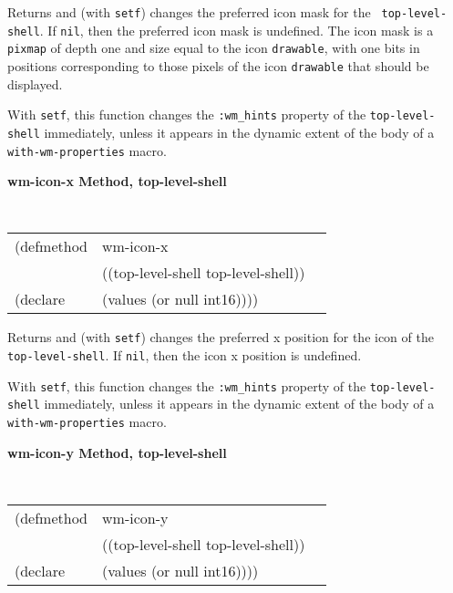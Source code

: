 \documentclass[twoside]{book}
\begin{document}
\begin{sloppy}
{\begin{flushright}
{}\end{flushright}}

\begin{flushright} \parbox[t]{6.125in}{
Returns and (with {\tt setf}) changes the preferred icon mask for the
{\tt
top-level-shell}. If {\tt nil}, then the preferred icon mask is
undefined. The icon mask is a {\tt pixmap} of depth one and size equal
to the icon {\tt drawable}, with one bits in positions corresponding to
those pixels of the icon {\tt drawable} that should be displayed.

With {\tt setf}, this function changes the {\tt :wm\_hints} property of
the {\tt top-level-shell} immediately, unless it appears in the dynamic extent of the
body of a {\tt with-wm-properties} macro.


}\end{flushright}

{\samepage
{\large {\bf wm-icon-x \hfill Method, top-level-shell}}
\begin{flushright} \parbox[t]{6.125in}{
\tt
\begin{tabular}{lll}
\raggedright
(defmethod & wm-icon-x & \\
           & ((top-level-shell  top-level-shell)) \\
(declare   & (values (or null int16))))
\end{tabular}
\rm

}\end{flushright}}

\begin{flushright} \parbox[t]{6.125in}{
Returns and (with {\tt setf}) changes the preferred x position for the icon of the {\tt
top-level-shell}. If {\tt nil}, then the icon x position is
undefined.

With {\tt setf}, this function changes the {\tt :wm\_hints} property of
the {\tt top-level-shell} immediately, unless it appears in the dynamic extent of the
body of a {\tt with-wm-properties} macro.


}\end{flushright}

{\samepage
{\large {\bf wm-icon-y \hfill Method, top-level-shell}}
\begin{flushright} \parbox[t]{6.125in}{
\tt
\begin{tabular}{lll}
\raggedright
(defmethod & wm-icon-y & \\
           & ((top-level-shell  top-level-shell)) \\
(declare   & (values (or null int16))))
\end{tabular}
\rm

}
\end{flushright}}
\end{sloppy}
\end{document}
